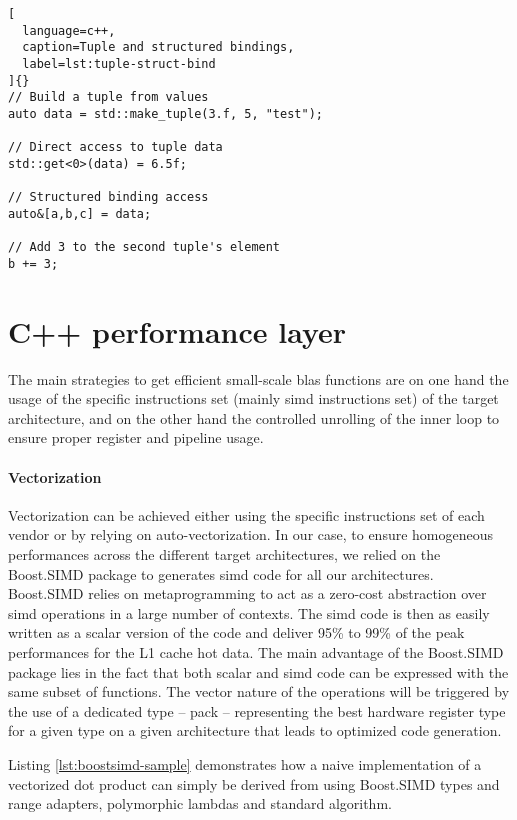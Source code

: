 \documentclass[../main]{subfiles}
\begin{document}
\begin{itemize}
\begin{lstlisting}[
  language=c++,
  caption=Tuple and structured bindings,
  label=lst:tuple-struct-bind
]{}
// Build a tuple from values
auto data = std::make_tuple(3.f, 5, "test");

// Direct access to tuple data
std::get<0>(data) = 6.5f;

// Structured binding access
auto&[a,b,c] = data;

// Add 3 to the second tuple's element
b += 3;
\end{lstlisting}

\end{itemize}

\section{
  C++ performance layer
}

The main strategies to get efficient small-scale \gls{blas}
functions are on one hand the usage of the specific
instructions set (mainly \gls{simd} instructions set) of the target
architecture, and on the other hand the controlled unrolling of the inner loop
to ensure proper register and pipeline usage.

\paragraph{
  Vectorization
}

Vectorization can be achieved either
using the specific instructions set of each vendor or
by relying on auto-vectorization. In our case, to ensure
homogeneous performances across the different target
architectures, we relied on the Boost.SIMD\cite{hpcs17} package
to generates \gls{simd} code for all our architectures.
Boost.SIMD relies on \cpp metaprogramming to act as
a zero-cost abstraction over \gls{simd} operations in a large
number of contexts. The \gls{simd} code is then as easily
written as a scalar version of the code and deliver 95\%
to 99\% of the peak performances for the L1 cache hot
data. The main advantage of the Boost.SIMD package
lies in the fact that both scalar and \gls{simd} code can
be expressed with the same subset of functions. The
vector nature of the operations will be triggered by
the use of a dedicated type – pack – representing the
best hardware register type for a given type on a given
architecture that leads to optimized code generation.

Listing \ref{lst:boostsimd-sample} demonstrates how a naive
implementation of a vectorized dot product can simply be
derived from using Boost.SIMD types and range adapters,
polymorphic lambdas and standard algorithm.
\end{document}
